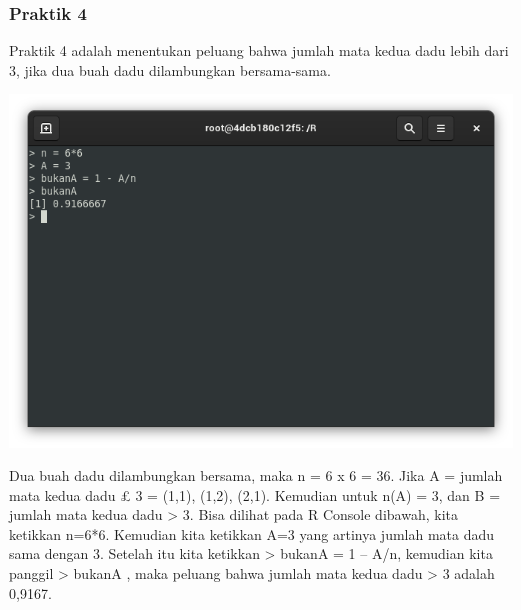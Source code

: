 \documentclass[a4paper,12pt]{article}
\begin{document}
\subsubsection{Praktik 4}
Praktik 4 adalah menentukan peluang bahwa jumlah mata kedua dadu lebih dari 3, jika dua buah dadu dilambungkan bersama-sama.
\begin{center}
	\includegraphics[scale=.5]{prak4}
\end{center}
Dua buah dadu dilambungkan bersama, maka n = 6 x 6 = 36. Jika A = {jumlah mata kedua dadu £ 3} = {(1,1), (1,2), (2,1)}. Kemudian untuk n(A) = 3, dan B = {jumlah mata kedua dadu > 3}. Bisa dilihat pada R Console dibawah, kita ketikkan n=6*6. Kemudian kita ketikkan A=3 yang artinya jumlah mata dadu sama dengan 3. Setelah itu kita ketikkan > bukanA = 1 – A/n, kemudian kita panggil > bukanA , maka peluang bahwa jumlah mata kedua dadu > 3 adalah 0,9167.
\end{document}
